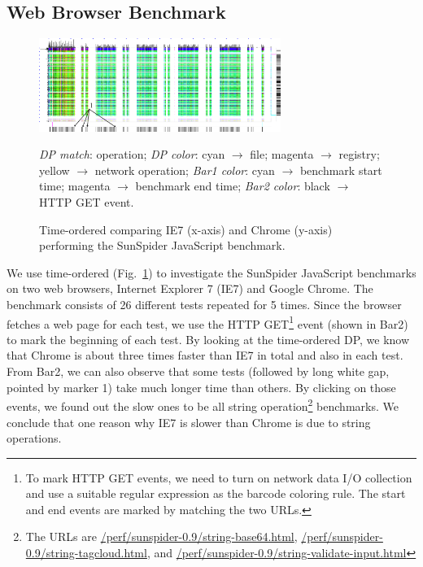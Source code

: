 \subsection{Web Browser Benchmark}
\label{sec:wbbench}

\begin{figure}[htb]
\begin{center}
\includegraphics[width=0.7\textwidth]{lviz/wbbench-dp.png}
\end{center}
\caption{Time-ordered \VDP{} comparing IE7 (x-axis) and Chrome (y-axis)
performing the
SunSpider JavaScript benchmark.
}
\label{fig:wbbench-dp}
{\it DP match}: operation;
{\it DP color}: cyan $\rightarrow$ file; magenta $\rightarrow$ registry;
yellow $\rightarrow$ network operation;
{\it Bar1 color}: cyan $\rightarrow$ benchmark start time;
magenta $\rightarrow$ benchmark end time;
{\it Bar2 color}: black $\rightarrow$ HTTP GET event.
\end{figure}

We use time-ordered \VDP{} (Fig.~\ref{fig:wbbench-dp}) to investigate the
SunSpider JavaScript benchmarks on
two web browsers, Internet Explorer 7 (IE7) and Google Chrome.
The benchmark consists of 26 different tests repeated for 5 times.
Since the browser fetches a web page for each test,
we use the HTTP GET\footnote{
To mark HTTP GET events, we need to turn on network data I/O collection
and use a suitable regular expression as the barcode coloring rule.
The start and end events are marked by matching the two URLs.
}
event (shown in Bar2) to mark the beginning
of each test.
By looking at the time-ordered DP, we know that Chrome is about three
times faster than IE7 in total and also in each test.
From Bar2,
we can also observe that some tests (followed by long white gap,
pointed by marker 1) take much longer time than others.
By clicking on those events, we found out the slow ones to be all string
operation\footnote{
The URLs are \url{/perf/sunspider-0.9/string-base64.html},
\url{/perf/sunspider-0.9/string-tagcloud.html},
and \url{/perf/sunspider-0.9/string-validate-input.html}}
benchmarks.
We conclude that one reason why IE7 is slower than Chrome is due to string operations.
